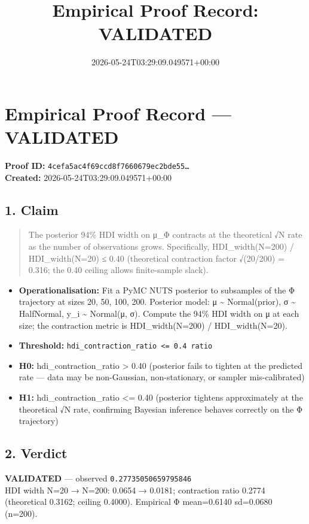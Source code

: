 \documentclass{article}
\title{Empirical Proof Record: VALIDATED}
\date{2026-05-24T03:29:09.049571+00:00}
\begin{document}
\maketitle
\section*{Empirical Proof Record --- \textcolor{validated}{\textbf{VALIDATED}}}
\textbf{Proof ID:} \texttt{4cefa5ac4f69ccd8f7660679ec2bde55\dots}\\
\textbf{Created:} 2026-05-24T03:29:09.049571+00:00
\subsection*{1. Claim}
\begin{quote}The posterior 94\% HDI width on μ\_Φ contracts at the theoretical √N rate as the number of observations grows. Specifically, HDI\_width(N=200) / HDI\_width(N=20) ≤ 0.40 (theoretical contraction factor √(20/200) = 0.316; the 0.40 ceiling allows finite-sample slack).\end{quote}
\begin{itemize}
\item \textbf{Operationalisation:} Fit a PyMC NUTS posterior to subsamples of the Φ trajectory at sizes 20, 50, 100, 200. Posterior model: μ \textasciitilde{} Normal(prior), σ \textasciitilde{} HalfNormal, y\_i \textasciitilde{} Normal(μ, σ). Compute the 94\% HDI width on μ at each size; the contraction metric is HDI\_width(N=200) / HDI\_width(N=20).
\item \textbf{Threshold:} \texttt{hdi\_contraction\_ratio <= 0.4 ratio}
\item \textbf{H0:} hdi\_contraction\_ratio > 0.40 (posterior fails to tighten at the predicted rate — data may be non-Gaussian, non-stationary, or sampler mis-calibrated)
\item \textbf{H1:} hdi\_contraction\_ratio <= 0.40 (posterior tightens approximately at the theoretical √N rate, confirming Bayesian inference behaves correctly on the Φ trajectory)
\end{itemize}
\subsection*{2. Verdict}
\textcolor{validated}{\textbf{VALIDATED}} --- observed \texttt{0.27735050659795846}\\
HDI width N=20 → N=200: 0.0654 → 0.0181; contraction ratio 0.2774 (theoretical 0.3162; ceiling 0.4000). Empirical Φ mean=0.6140 sd=0.0680 (n=200).
\end{document}

